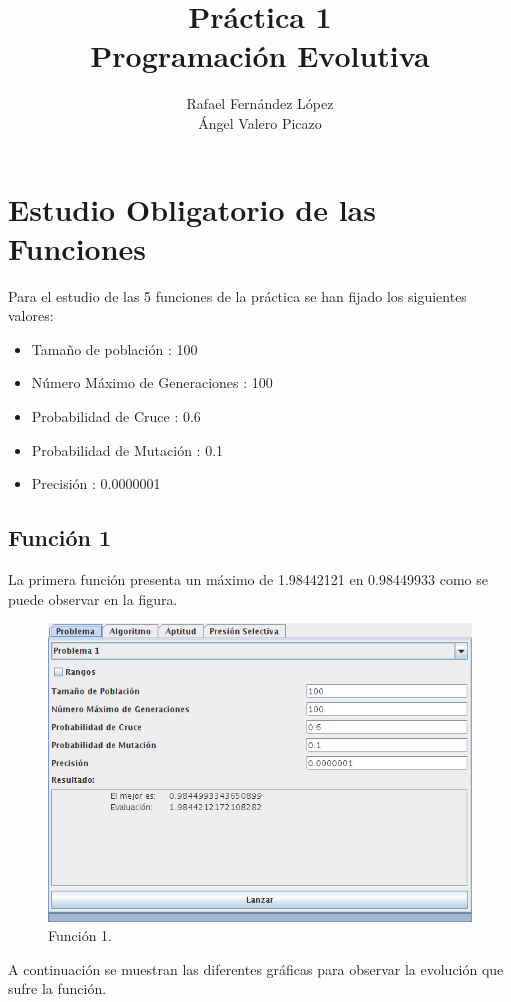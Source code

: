 \documentclass[12pt]{article}
\title{Práctica 1\\Programación Evolutiva}
\author{Rafael Fernández López\\Ángel Valero Picazo}
\date{}
\begin{document}
\maketitle
\newpage
\newpage
\tableofcontents
\newpage

\section{Estudio Obligatorio de las Funciones}	
	Para el estudio de las 5 funciones de la práctica se han fijado los siguientes valores:
	\begin{itemize}
		\item Tamaño de población : 100
		\item Número Máximo de Generaciones : 100
		\item Probabilidad de Cruce : 0.6
		\item Probabilidad de Mutación : 0.1
		\item Precisión : 0.0000001
	\end{itemize}

\subsection{Función 1}
	La primera función presenta un máximo de 1.98442121 en 0.98449933 como se puede observar en la figura.
\begin{figure}[H]
\centering
\includegraphics[scale=0.5]{graficas/F1inicial}
\caption{Función 1.}
\label{fig}
\end{figure}
	A continuación se muestran las diferentes gráficas para observar la evolución que sufre la función.
\end{document}
